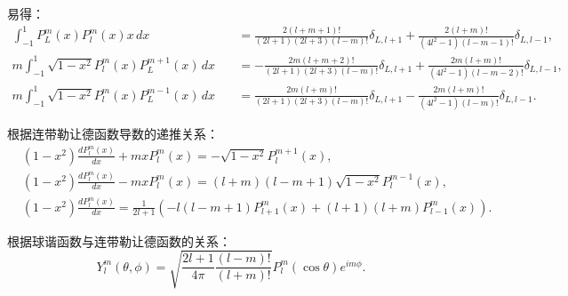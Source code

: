 \documentclass{article}
\begin{document}
	易得：
	\begin{align*}
		\int_{-1}^{1} P_L^m(x) P_l^m(x) x \,dx 
		&\quad= \frac{2(l+m+1)!}{(2l+1)(2l+3)(l-m)!}\delta_{L,l+1} + \frac{2(l+m)!}{(4l^2-1)(l-m-1)!}\delta_{L,l-1}, \\
		m\int_{-1}^{1} \sqrt{1 - x^2} P_l^m(x) P_L^{m+1}(x) \,dx 
		&\quad= -\frac{2m(l+m+2)!}{(2l+1)(2l+3)(l-m)!}\delta_{L,l+1} + \frac{2m(l+m)!}{(4l^2-1)(l-m-2)!}\delta_{L,l-1}, \\
		m\int_{-1}^{1} \sqrt{1 - x^2} P_l^m(x) P_L^{m-1}(x) \,dx 
		&\quad= \frac{2m(l+m)!}{(2l+1)(2l+3)(l-m)!}\delta_{L,l+1} - \frac{2m(l+m)!}{(4l^2-1)(l-m)!}\delta_{L,l-1}.
	\end{align*}
	
	根据连带勒让德函数导数的递推关系：
	\begin{align*}
		&(1 - x^2)\frac{dP_l^m(x)}{dx} + m x P_l^m(x) = -\sqrt{1 - x^2}P_l^{m+1}(x), \\
		&(1 - x^2)\frac{dP_l^m(x)}{dx} - m x P_l^m(x) = (l+m)(l-m+1)\sqrt{1 - x^2}P_l^{m-1}(x), \\
		&(1 - x^2)\frac{dP_l^m(x)}{dx} = \frac{1}{2l+1}\left(-l(l-m+1)P_{l+1}^m(x)+(l+1)(l+m)P_{l-1}^m(x)\right).
	\end{align*}
	
	根据球谐函数与连带勒让德函数的关系：
	\[
	Y_l^m(\theta,\phi) = \sqrt{\frac{2l+1}{4\pi}\frac{(l-m)!}{(l+m)!}} P_l^m(\cos\theta)e^{im\phi}.
	\]
	
\end{document}
